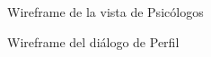 \begin{figure}[H]
    \caption{Wireframe de la vista de Psicólogos}
    \label{wireframe-psicologos}
\end{figure}

\begin{figure}[H]
    \caption{Wireframe del diálogo de Perfil}
    \label{wireframe-perfil}
\end{figure}

